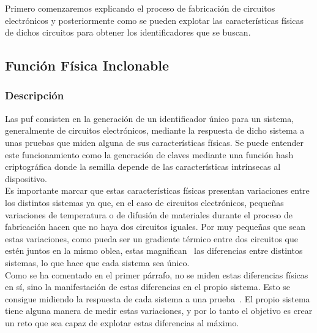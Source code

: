 \documentclass[spanish]{template/minim}
\begin{document}
Primero comenzaremos explicando el proceso de fabricación de circuitos electrónicos y posteriormente como se pueden explotar las características físicas de dichos circuitos para obtener los identificadores que se buscan.


\subsection{Función Física Inclonable}\label{sec:puf}

\subsubsection{Descripción}\label{sec:puf_desc}

Las \gls{puf} consisten en la generación de un identificador único para un sistema, generalmente de circuitos electrónicos, mediante la respuesta de dicho sistema a unas pruebas que miden alguna de sus características físicas. Se puede entender este funcionamiento como la generación de claves mediante una función hash criptográfica donde la semilla depende de las características intrínsecas al dispositivo.\\

Es importante marcar que estas características físicas presentan variaciones entre los distintos sistemas ya que, en el caso de circuitos electrónicos, pequeñas variaciones de temperatura o de difusión de materiales durante el proceso de fabricación hacen que no haya dos circuitos iguales. Por muy pequeñas que sean estas variaciones, como pueda ser un gradiente térmico entre dos circuitos que estén juntos en la mismo oblea, estas magnifican~ las diferencias entre distintos sistemas, lo que hace que cada sistema sea {\color{accent}único}.\\

Como se ha comentado en el primer párrafo, no se miden estas diferencias físicas en sí, sino la manifestación de estas diferencias en el propio sistema. Esto se consigue midiendo la {\color{accent}respuesta} de cada sistema a una prueba~. El propio sistema tiene alguna manera de medir estas variaciones, y por lo tanto el objetivo es crear un reto que sea capaz de explotar estas diferencias al máximo.\\
\end{document}

